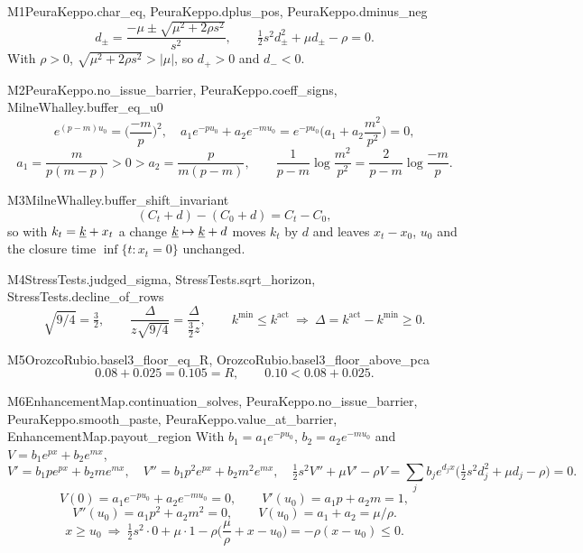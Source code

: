 \begin{mproof}{M1}{PeuraKeppo.char_eq, PeuraKeppo.dplus_pos, PeuraKeppo.dminus_neg}
\[ d_\pm=\frac{-\mu\pm\sqrt{\mu^2+2\rho s^2}}{s^2},\qquad \tfrac12 s^2d_\pm^2+\mu d_\pm-\rho=0. \]
With $\rho>0$, $\sqrt{\mu^2+2\rho s^2}>|\mu|$, so $d_+>0$ and $d_-<0$.
\end{mproof}

\begin{mproof}{M2}{PeuraKeppo.no_issue_barrier, PeuraKeppo.coeff_signs, MilneWhalley.buffer_eq_u0}
\[ e^{(p-m)u_0}=\Big(\frac{-m}{p}\Big)^{2},\quad a_1e^{-pu_0}+a_2e^{-mu_0}=e^{-pu_0}\Big(a_1+a_2\frac{m^2}{p^2}\Big)=0, \]
\[ a_1=\frac{m}{p(m-p)}>0>a_2=\frac{p}{m(p-m)},\qquad \frac{1}{p-m}\log\frac{m^2}{p^2}=\frac{2}{p-m}\log\frac{-m}{p}. \]
\end{mproof}

\begin{mproof}{M3}{MilneWhalley.buffer_shift_invariant}
\[ (C_t+d)-(C_0+d)=C_t-C_0, \]
so with $k_t=\underline{k}+x_t$ a change $\underline{k}\mapsto\underline{k}+d$ moves $k_t$ by $d$ and leaves $x_t-x_0$, $u_0$ and the closure time $\inf\{t:x_t=0\}$ unchanged.
\end{mproof}

\begin{mproof}{M4}{StressTests.judged_sigma, StressTests.sqrt_horizon, StressTests.decline_of_rows}
\[ \sqrt{9/4}=\tfrac32,\qquad \frac{\Delta}{z\sqrt{9/4}}=\frac{\Delta}{\tfrac32 z},\qquad k^{\min}\le k^{\mathrm{act}}\ \Rightarrow\ \Delta=k^{\mathrm{act}}-k^{\min}\ge0. \]
\end{mproof}

\begin{mproof}{M5}{OrozcoRubio.basel3_floor_eq_R, OrozcoRubio.basel3_floor_above_pca}
\[ 0.08+0.025=0.105=R,\qquad 0.10<0.08+0.025. \]
\end{mproof}

\begin{mproof}{M6}{EnhancementMap.continuation_solves, PeuraKeppo.no_issue_barrier, PeuraKeppo.smooth_paste, PeuraKeppo.value_at_barrier, EnhancementMap.payout_region}
With $b_1=a_1e^{-pu_0}$, $b_2=a_2e^{-mu_0}$ and $V=b_1e^{px}+b_2e^{mx}$,
\[ V'=b_1pe^{px}+b_2me^{mx},\quad V''=b_1p^2e^{px}+b_2m^2e^{mx},\quad \tfrac12 s^2V''+\mu V'-\rho V=\sum_j b_je^{d_jx}\big(\tfrac12 s^2d_j^2+\mu d_j-\rho\big)=0. \]
\[ V(0)=a_1e^{-pu_0}+a_2e^{-mu_0}=0,\qquad V'(u_0)=a_1p+a_2m=1, \]
\[ V''(u_0)=a_1p^2+a_2m^2=0,\qquad V(u_0)=a_1+a_2=\mu/\rho. \]
\[ x\ge u_0\ \Rightarrow\ \tfrac12 s^2\cdot0+\mu\cdot1-\rho\Big(\frac{\mu}{\rho}+x-u_0\Big)=-\rho(x-u_0)\le0. \]
\end{mproof}

